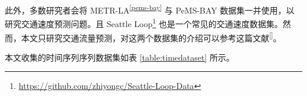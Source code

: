 \documentclass{ctexart}
\renewcommand{\cite}[1]{\textsuperscript{[\citenum{#1}]}}
\begin{document}
此外，多数研究者会将 METR-LA\textsuperscript{\ref{pems-bay}} 与 PeMS-BAY 数据集一并使用，以研究交通速度预测问题。且 Seattle Loop\footnote{\url{https://github.com/zhiyongc/Seattle-Loop-Data}} 也是一个常见的交通速度数据集。然而，本文只研究交通流量预测，对这两个数据集的介绍可以参考这篇文献\cite{jiang_graph_2022}。

本文收集的时间序列序列数据集如表 \ref{table:timedataset} 所示。

\end{document}
